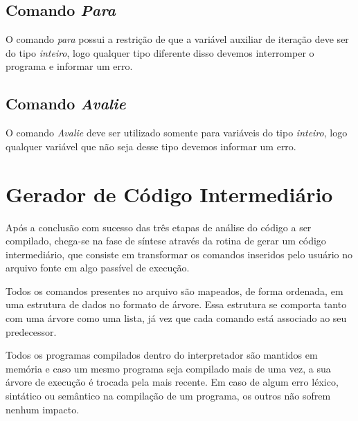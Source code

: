 \documentclass[
12pt,				%
a4paper,			%
english,			%
french,				%
spanish,			%
brazil,				%
article
]{abntex2}
\begin{document}
\subsection{Comando \textit{Para}}
O comando \textit{para} possui a restrição de que a variável auxiliar de iteração deve ser do tipo \textit{inteiro}, logo qualquer tipo diferente disso devemos interromper o programa e informar um erro.

\subsection{Comando \textit{Avalie}}
O comando \textit{Avalie} deve ser utilizado somente para variáveis do tipo \textit{inteiro}, logo qualquer variável que não seja desse tipo devemos informar um erro.

\section{Gerador de Código Intermediário}

Após a conclusão com sucesso das três etapas de análise do código a ser compilado, chega-se na fase de síntese através da rotina de gerar um código intermediário, que consiste em transformar os comandos inseridos pelo usuário no arquivo fonte em algo passível de execução.

Todos os comandos presentes no arquivo são mapeados, de forma ordenada, em uma estrutura de dados no formato de árvore. Essa estrutura se comporta tanto com uma árvore como uma lista, já vez que cada comando está associado ao seu predecessor.

Todos os programas compilados dentro do interpretador são mantidos em memória e caso um mesmo programa seja compilado mais de uma vez, a sua árvore de execução é trocada pela mais recente. Em caso de algum erro léxico, sintático ou semântico na compilação de um programa, os outros não sofrem nenhum impacto.
\end{document}
